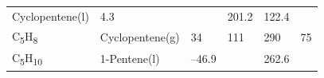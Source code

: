 \documentclass[
  9pt,
]{extbook}
\theoremstyle{definition}
\theoremstyle{definition}
\theoremstyle{definition}
\theoremstyle{remark}
\begin{document}
\begin{longtable}[]{@{}llllll@{}}
\begin{minipage}[t]{0.17\columnwidth}
Cyclopentene(l)\strut
\end{minipage} & \begin{minipage}[t]{0.15\columnwidth}\raggedright
4.3\strut
\end{minipage} & \begin{minipage}[t]{0.15\columnwidth}\raggedright
\strut
\end{minipage} & \begin{minipage}[t]{0.14\columnwidth}\raggedright
201.2\strut
\end{minipage} & \begin{minipage}[t]{0.14\columnwidth}\raggedright
122.4\strut
\end{minipage}\tabularnewline
\begin{minipage}[t]{0.07\columnwidth}\raggedright
C\textsubscript{5}H\textsubscript{8}\strut
\end{minipage} & \begin{minipage}[t]{0.17\columnwidth}\raggedright
Cyclopentene(g)\strut
\end{minipage} & \begin{minipage}[t]{0.15\columnwidth}\raggedright
34\strut
\end{minipage} & \begin{minipage}[t]{0.15\columnwidth}\raggedright
111\strut
\end{minipage} & \begin{minipage}[t]{0.14\columnwidth}\raggedright
290\strut
\end{minipage} & \begin{minipage}[t]{0.14\columnwidth}\raggedright
75\strut
\end{minipage}\tabularnewline
\begin{minipage}[t]{0.07\columnwidth}\raggedright
C\textsubscript{5}H\textsubscript{10}\strut
\end{minipage} & \begin{minipage}[t]{0.17\columnwidth}\raggedright
1-Pentene(l)\strut
\end{minipage} & \begin{minipage}[t]{0.15\columnwidth}\raggedright
--46.9\strut
\end{minipage} & \begin{minipage}[t]{0.15\columnwidth}\raggedright
\strut
\end{minipage} & \begin{minipage}[t]{0.14\columnwidth}\raggedright
262.6\strut
\end{minipage} & \begin{minipage}[t]{0.14\columnwidth}\raggedright

\end{minipage}
\end{longtable}
\end{document}
